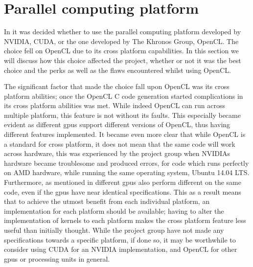 \section{Parallel computing platform}
In  it was decided whether to use the parallel computing platform developed by NVIDIA, CUDA, or the one developed by The Khronos Group, OpenCL.
The choice fell on OpenCL due to its cross platform capabilities.
In this section we will discuss how this choice affected the project, whether or not it was the best choice and the perks as well as the flaws encountered whilst using OpenCL.

The significant factor that made the choice fall upon OpenCL was its cross platform abilities; once the OpenCL C code generation started complications in its cross platform abilities was met.
While indeed OpenCL can run across multiple platform, this feature is not without its faults.
This especially became evident as different \acrshort{gpu}s support different versions of OpenCL, thus having different features implemented.
It became even more clear that while OpenCL is a standard for cross platform, it does not mean that the same code will work across hardware, this was experienced by the project group when NVIDIAs hardware became troublesome and produced errors, for code which runs perfectly on AMD hardware, while running the same operating system, Ubuntu 14.04 LTS.
Furthermore, as mentioned in  different \acrshort{gpu}s also perform different on the same code, even if the \acrshort{gpu}s have near identical specifications.
This as a result means that to achieve the utmost benefit from each individual platform, an implementation for each platform should be available; having to alter the implementation of kernels to each platform makes the cross platform feature less useful than initially thought.
While the project group have not made any specifications towards a specific platform, if done so, it may be worthwhile to consider using CUDA for an NVIDIA implementation, and OpenCL for other \acrshort{gpu}s or processing units in general.

